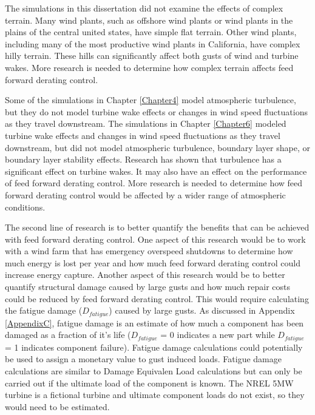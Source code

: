 The simulations in this dissertation did not examine the effects of complex terrain. Many wind plants, such as offshore wind plants or wind plants in the plains of the central united states, have simple flat terrain. Other wind plants, including many of the most productive wind plants in California, have complex hilly terrain. These hills can significantly affect both gusts of wind and turbine wakes. More research is needed to determine how complex terrain affects feed forward derating control. 

Some of the simulations in Chapter \ref{Chapter4} model atmospheric turbulence, but they do not model turbine wake effects or changes in wind speed fluctuations as they travel downstream. The simulations in Chapter \ref{Chapter6} modeled  turbine wake effects and changes in wind speed fluctuations as they travel downstream, but did not model atmospheric turbulence, boundary layer shape, or boundary layer stability effects. Research has shown that turbulence has a significant effect on turbine wakes.\cite{troldborg2015, troldborg2010,madsen2010} It may also have an effect on the performance of feed forward derating control. More research is needed to determine how feed forward derating control would be affected by a wider range of atmospheric conditions.

The second line of research is to better quantify the benefits that can be achieved with feed forward derating control. One aspect of this research would be to work with a wind farm that has emergency overspeed shutdowns to determine how much energy is lost per year and how much feed forward derating control could increase energy capture. Another aspect of this research would be to better quantify structural damage caused by large gusts and how much repair costs could be reduced by feed forward derating control. This would require calculating the fatigue damage ($D_{fatigue}$) caused by large gusts. As discussed in Appendix \ref{AppendixC}, fatigue damage is an estimate of how much a component has been damaged as a fraction of it's life ($D_{fatigue}$ = 0 indicates a new part while $D_{fatigue}$ = 1 indicates component failure). Fatigue damage calculations could potentially be used to assign a monetary value to gust induced loads. Fatigue damage calculations are similar to Damage Equivalen Load calculations but can only be carried out if the ultimate load of the component is known. The NREL 5MW turbine is a fictional turbine and ultimate component loads do not exist, so they would need to be estimated. 